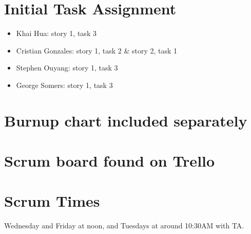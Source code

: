 \documentclass[11pt]{article}
\begin{document}
	\section{Initial Task Assignment}
	    \vspace{-3mm}
	    \begin{itemize}
		    \item Khai Hua: story 1, task 3
		    \item Cristian Gonzales: story 1, task 2 \& story 2, task 1
		    \item Stephen Ouyang: story 1, task 3
		    \item George Somers: story 1, task 3
		\end{itemize}
	\section{Burnup chart included separately}
	\section{Scrum board found on Trello}
	\section{Scrum Times}
	    Wednesday and Friday at noon, and Tuesdays at around 10:30AM with TA.
\end{document}
